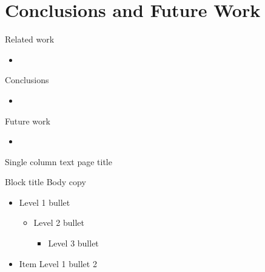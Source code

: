 \documentclass[t]{beamer}
\begin{document}
\section{Conclusions and Future Work}



\begin{frame}{Related work}

  		\begin{itemize}    
  			\item 
		\end{itemize}
  	
\end{frame}




\begin{frame}{Conclusions}

  		\begin{itemize}    
  			\item 
		\end{itemize}
  	
\end{frame}




\begin{frame}{Future work}

  		\begin{itemize}    
  			\item 
		\end{itemize}
  	
\end{frame}


\begin{frame}{Single column text page title}
	\begin{block}{Block title}
  		Body copy
  		\begin{itemize}    
  			\item Level 1 bullet
			\begin{itemize}
					\item Level 2 bullet
					\begin{itemize}
						\item Level 3 bullet
					\end{itemize}
			\end{itemize}
  			\item Item Level 1 bullet 2
  		\end{itemize}    
	\end{block}
\end{frame}
\end{document}
